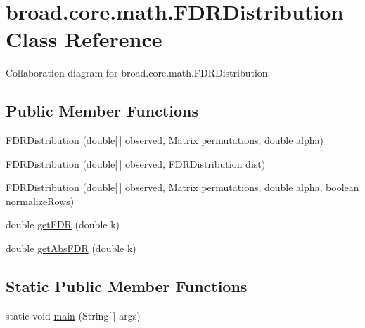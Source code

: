 \hypertarget{classbroad_1_1core_1_1math_1_1_f_d_r_distribution}{\section{broad.\+core.\+math.\+F\+D\+R\+Distribution Class Reference}
\label{classbroad_1_1core_1_1math_1_1_f_d_r_distribution}
}


Collaboration diagram for broad.\+core.\+math.\+F\+D\+R\+Distribution\+:
\subsection*{Public Member Functions}
\begin{DoxyCompactItemize}
\item 
\hyperlink{classbroad_1_1core_1_1math_1_1_f_d_r_distribution_ad067eeff06e3a5165ab6ef6e1728a840}{F\+D\+R\+Distribution} (double\mbox{[}$\,$\mbox{]} observed, \hyperlink{class_jama_1_1_matrix}{Matrix} permutations, double alpha)
\item 
\hyperlink{classbroad_1_1core_1_1math_1_1_f_d_r_distribution_a3e297c32c42836903800ad256fa64f2f}{F\+D\+R\+Distribution} (double\mbox{[}$\,$\mbox{]} observed, \hyperlink{classbroad_1_1core_1_1math_1_1_f_d_r_distribution}{F\+D\+R\+Distribution} dist)
\item 
\hyperlink{classbroad_1_1core_1_1math_1_1_f_d_r_distribution_aba60ce138777ae36f2dc50e1e9bae8de}{F\+D\+R\+Distribution} (double\mbox{[}$\,$\mbox{]} observed, \hyperlink{class_jama_1_1_matrix}{Matrix} permutations, double alpha, boolean normalize\+Rows)
\item 
double \hyperlink{classbroad_1_1core_1_1math_1_1_f_d_r_distribution_af1aeb6050c5dee84f703411053e8539b}{get\+F\+D\+R} (double k)
\item 
double \hyperlink{classbroad_1_1core_1_1math_1_1_f_d_r_distribution_a9c06a0aaa14de7471871fa375ca9be0a}{get\+Abs\+F\+D\+R} (double k)
\end{DoxyCompactItemize}
\subsection*{Static Public Member Functions}
\begin{DoxyCompactItemize}
\item 
static void \hyperlink{classbroad_1_1core_1_1math_1_1_f_d_r_distribution_a794d06b3bd991c3a7f4205e70cac7fa4}{main} (String\mbox{[}$\,$\mbox{]} args)
\end{DoxyCompactItemize}


